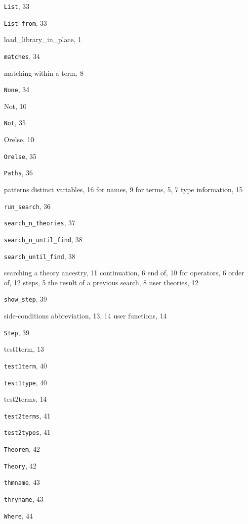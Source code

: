 \begin{theindex}
  \indexspace

  \item {\tt  List}, 33
  \item {\tt  List\_from}, 33
  \item {\ptt load\_library\_in\_place}, 1

  \indexspace

  \item {\tt  matches}, 34
  \item matching
    \subitem within a term, 8

  \indexspace

  \item {\tt  None}, 34
  \item {\ptt Not}, 10
  \item {\tt  Not}, 35

  \indexspace

  \item {\ptt Orelse}, 10
  \item {\tt  Orelse}, 35

  \indexspace

  \item {\tt  Paths}, 36
  \item patterns
    \subitem distinct variables, 16
    \subitem for names, 9
    \subitem for terms, 5, 7
    \subitem type information, 15

  \indexspace

  \item {\tt  run\_search}, 36

  \indexspace

  \item {\tt  search\_n\_theories}, 37
  \item {\tt  search\_n\_until\_find}, 38
  \item {\tt  search\_until\_find}, 38
  \item searching
    \subitem a theory ancestry, 11
    \subitem continuation, 6
    \subitem end of, 10
    \subitem for operators, 6
    \subitem order of, 12
    \subitem steps, 5
    \subitem the result of a previous search, 8
    \subitem user theories, 12
  \item {\tt  show\_step}, 39
  \item side-conditions
    \subitem abbreviation, 13, 14
    \subitem user functions, 14
  \item {\tt  Step}, 39

  \indexspace

  \item {\ptt test1term}, 13
  \item {\tt  test1term}, 40
  \item {\tt  test1type}, 40
  \item {\ptt test2terms}, 14
  \item {\tt  test2terms}, 41
  \item {\tt  test2types}, 41
  \item {\tt  Theorem}, 42
  \item {\tt  Theory}, 42
  \item {\tt  thmname}, 43
  \item {\tt  thryname}, 43

  \indexspace

  \item {\tt  Where}, 44

\end{theindex}
